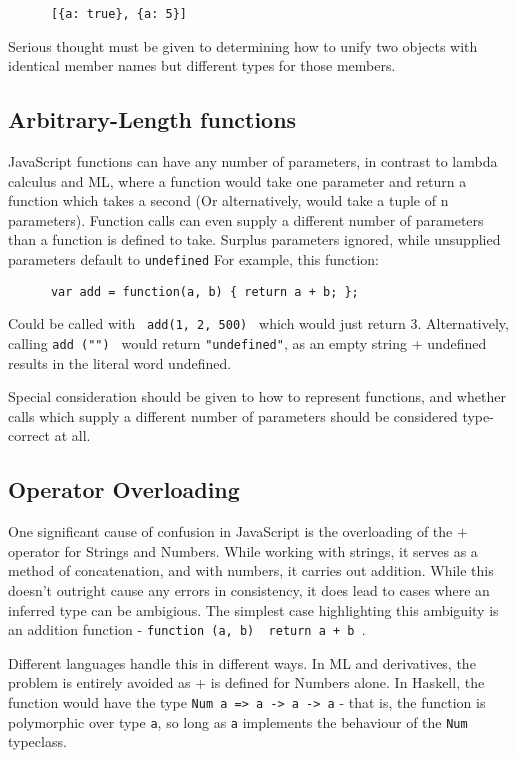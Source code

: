 \documentclass[british, twoside]{bhamthesis}
\theoremstyle{definition}
\begin{document}
    \begin{lstlisting}
      [{a: true}, {a: 5}]
    \end{lstlisting}

    Serious thought must be given to determining how to unify two objects with identical member names but different types for those members.

  \subsection{Arbitrary-Length functions}
    JavaScript functions can have any number of parameters, in contrast to lambda calculus and ML, where a function would take one parameter and return a function which takes a second (Or alternatively, would take a tuple of n parameters). Function calls can even supply a different number of parameters than a function is defined to take. Surplus parameters ignored, while unsupplied parameters default to \texttt {undefined} For example, this function:

    \begin{lstlisting}
      var add = function(a, b) { return a + b; };
    \end{lstlisting}

    Could be called with \texttt { add(1, 2, 500) } which would just return 3. Alternatively, calling \texttt {add ("") } would return \texttt {"undefined"}, as an empty string + undefined results in the literal word undefined.

    Special consideration should be given to how to represent functions, and whether calls which supply a different number of parameters should be considered type-correct at all.

  \subsection{Operator Overloading}
    One significant cause of confusion in JavaScript is the overloading of the $+$ operator for Strings and Numbers. While working with strings, it serves as a method of concatenation, and with numbers, it carries out addition. While this doesn't outright cause any errors in consistency, it does lead to cases where an inferred type can be ambigious. The simplest case highlighting this ambiguity is an addition function - \texttt {function (a, b) { return a + b }}.

    Different languages handle this in different ways. In ML and derivatives, the problem is entirely avoided as + is defined for Numbers alone. In Haskell, the function would have the type \texttt {Num a => a -> a -> a} - that is, the function is polymorphic over type \texttt{a}, so long as \texttt{a} implements the behaviour of the \texttt{Num} typeclass.
\end{document}
